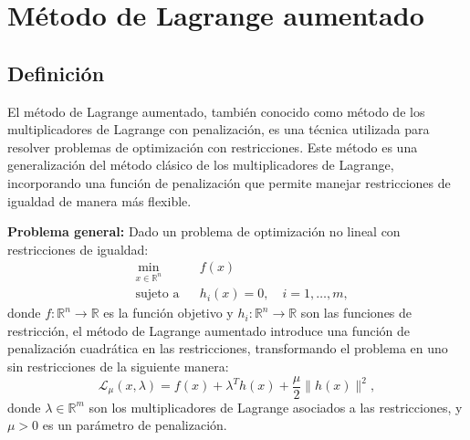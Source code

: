 \documentclass[12pt]{book}
\theoremstyle{definition}
\theoremstyle{plain}
\theoremstyle{remark}
\begin{document}

\section{Método de Lagrange aumentado} %


\subsection{Definición}

El método de Lagrange aumentado, también conocido como método de los multiplicadores de Lagrange con penalización, es una técnica utilizada para resolver problemas de optimización con restricciones. Este método es una generalización del método clásico de los multiplicadores de Lagrange, incorporando una función de penalización que permite manejar restricciones de igualdad de manera más flexible.

\textbf{Problema general:}
Dado un problema de optimización no lineal con restricciones de igualdad:
\begin{equation*}
    \begin{aligned}
        & \min_{x \in \mathbb{R}^n} & & f(x) \\
        & \text{sujeto a} & & h_i(x) = 0, \quad i = 1, \ldots, m,
    \end{aligned}
\end{equation*}
\noindent donde $f: \mathbb{R}^n \to \mathbb{R}$ es la función objetivo y $h_i: \mathbb{R}^n \to \mathbb{R}$ son las funciones de restricción, el método de Lagrange aumentado introduce una función de penalización cuadrática en las restricciones, transformando el problema en uno sin restricciones de la siguiente manera:
\begin{equation*}
    \mathcal{L}_\mu(x, \lambda) = f(x) + \lambda^T h(x) + \frac{\mu}{2} \|h(x)\|^2,
\end{equation*}
\noindent donde $\lambda \in \mathbb{R}^m$ son los multiplicadores de Lagrange asociados a las restricciones, y $\mu > 0$ es un parámetro de penalización.
\end{document}
